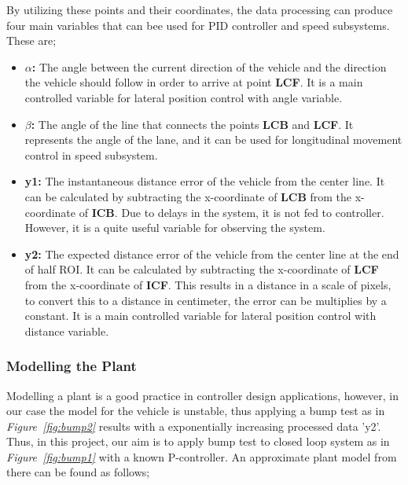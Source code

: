 \documentclass[a4paper,12pt]{article}
\begin{document}
\begin{enumerate}
				
	By utilizing these points and their coordinates, the data processing can produce four main variables that can bee used for PID controller and speed subsystems. These are;
	
	\begin{itemize}
		\item \textbf{$\alpha$:} The angle between the current direction of the vehicle and the direction the vehicle should follow in order to arrive at point \textbf{LCF}. It is a main controlled variable for lateral position control with angle variable.
		
		\item \textbf{$\beta$:} The angle of the line that connects the points \textbf{LCB} and \textbf{LCF}. It represents the angle of the lane, and it can be used for longitudinal movement control in speed subsystem.
		
		\item \textbf{y1:} The instantaneous distance error of the vehicle from the center line. It can be calculated by subtracting the x-coordinate of \textbf{LCB} from the x-coordinate of \textbf{ICB}. Due to delays in the system, it is not fed to controller. However, it is a quite useful variable for observing the system.  
		
		\item \textbf{y2:} The expected distance error of the vehicle from the center line at the end of half ROI. It can be calculated by subtracting the x-coordinate of \textbf{LCF} from the x-coordinate of \textbf{ICF}. This results in a distance in a scale of pixels, to convert this to a distance in centimeter, the error can be multiplies by a constant. It is a main controlled variable for lateral position control with distance variable.
	
	
	\end{itemize}	 			

	
	\subsubsection*{Modelling the Plant}
	
	Modelling a plant is a good practice in controller design applications, however, in our case the model for the vehicle is unstable, thus applying a bump test as in \textit{Figure~\ref{fig:bump2}} results with a exponentially increasing processed data 'y2'. Thus, in this project, our aim is to apply bump test to closed loop system as in \textit{Figure~\ref{fig:bump1}} with a known P-controller. An approximate plant model from there can be found as follows;
	

\end{enumerate}
\end{document}
